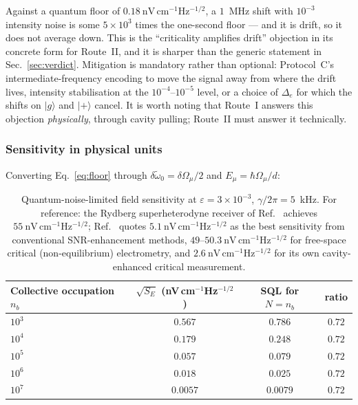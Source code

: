 \documentclass[11pt,a4paper]{article}
\newcommand{\Omu}{\Omega_{\mu}}
\newcommand{\wt}{\tilde{\omega}_{0}}
\newcommand{\ket}[1]{\lvert #1 \rangle}
\begin{document}
\noindent Against a quantum floor of $0.18~\mathrm{nV\,cm^{-1}Hz^{-1/2}}$, a $1$~MHz shift
with $10^{-3}$ intensity noise is some $5\times10^3$ times the one-second floor --- and it is
drift, so it does not average down. This is the ``criticality amplifies drift'' objection in
its concrete form for Route~II, and it is sharper than the generic statement in
Sec.~\ref{sec:verdict}. Mitigation is mandatory rather than optional: Protocol~C's
intermediate-frequency encoding to move the signal away from where the drift lives, intensity
stabilisation at the $10^{-4}$--$10^{-5}$ level, or a choice of $\Delta_e$ for which the
shifts on $\ket{g}$ and $\ket{+}$ cancel. It is worth noting that Route~I answers this
objection \emph{physically}, through cavity pulling; Route~II must answer it technically.

\subsubsection{Sensitivity in physical units}

Converting Eq.~\eqref{eq:floor} through $\delta\wt = \delta\Omu/2$ and $E_\mu=\hbar\Omu/d$:

\begin{table}[h]
\centering
\small
\begin{tabular}{lccc}
\toprule
Collective occupation $n_b$ & $\sqrt{S_{E}}$ (nV\,cm$^{-1}$Hz$^{-1/2}$) & SQL for $N=n_b$ & ratio \\
\midrule
$10^{3}$ & $0.567$ & $0.786$ & $0.72$\\
$10^{4}$ & $0.179$ & $0.248$ & $0.72$\\
$10^{5}$ & $0.057$ & $0.079$ & $0.72$\\
$10^{6}$ & $0.018$ & $0.025$ & $0.72$\\
$10^{7}$ & $0.0057$ & $0.0079$ & $0.72$\\
\bottomrule
\end{tabular}
\caption{Quantum-noise-limited field sensitivity at $\varepsilon=3\times10^{-3}$,
$\gamma/2\pi=5$~kHz. For reference: the Rydberg superheterodyne receiver of
Ref.~\cite{Jing2020} achieves $55~\mathrm{nV\,cm^{-1}Hz^{-1/2}}$; Ref.~\cite{Wang2025}
quotes $5.1~\mathrm{nV\,cm^{-1}Hz^{-1/2}}$ as the best sensitivity from conventional
SNR-enhancement methods, $49$--$50.3~\mathrm{nV\,cm^{-1}Hz^{-1/2}}$ for free-space critical
(non-equilibrium) electrometry, and $2.6~\mathrm{nV\,cm^{-1}Hz^{-1/2}}$ for its own
cavity-enhanced critical measurement.}
\end{table}
\end{document}
